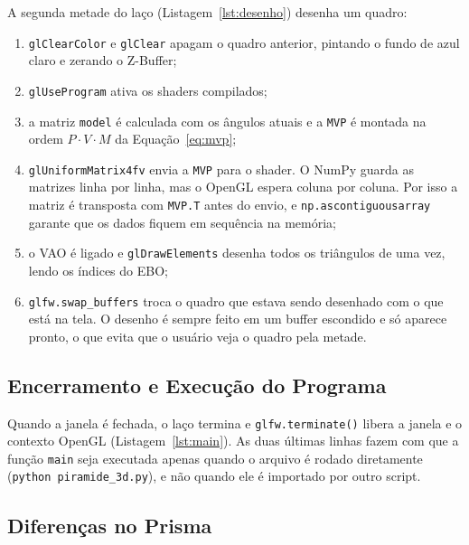 \documentclass{article}
\begin{document}
A segunda metade do laço (Listagem~\ref{lst:desenho}) desenha um quadro:

\begin{enumerate}
    \item \texttt{glClearColor} e \texttt{glClear} apagam o quadro anterior, pintando o fundo de azul claro e zerando o Z-Buffer;
    \item \texttt{glUseProgram} ativa os shaders compilados;
    \item a matriz \texttt{model} é calculada com os ângulos atuais e a \texttt{MVP} é montada na ordem $P \cdot V \cdot M$ da Equação~\ref{eq:mvp};
    \item \texttt{glUniformMatrix4fv} envia a \texttt{MVP} para o shader. O NumPy guarda as matrizes linha por linha, mas o OpenGL espera coluna por coluna. Por isso a matriz é transposta com \texttt{MVP.T} antes do envio, e \texttt{np.ascontiguousarray} garante que os dados fiquem em sequência na memória;
    \item o VAO é ligado e \texttt{glDrawElements} desenha todos os triângulos de uma vez, lendo os índices do EBO;
    \item \texttt{glfw.swap\_buffers} troca o quadro que estava sendo desenhado com o que está na tela. O desenho é sempre feito em um buffer escondido e só aparece pronto, o que evita que o usuário veja o quadro pela metade.
\end{enumerate}



\subsection{Encerramento e Execução do Programa}

Quando a janela é fechada, o laço termina e \texttt{glfw.terminate()} libera a janela e o contexto OpenGL (Listagem~\ref{lst:main}). As duas últimas linhas fazem com que a função \texttt{main} seja executada apenas quando o arquivo é rodado diretamente (\texttt{python piramide\_3d.py}), e não quando ele é importado por outro script.



\subsection{Diferenças no Prisma}
\end{document}

